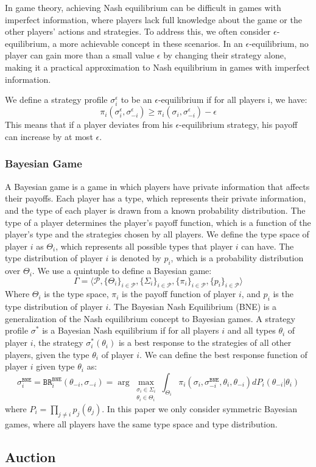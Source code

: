 \documentclass[11pt]{article}
\begin{document}
In game theory, achieving Nash equilibrium can be difficult in games with imperfect information, where players lack full knowledge about the game or the other players' actions and strategies.
To address this, we often consider $\epsilon$-equilibrium, a more achievable concept in these scenarios. In an $\epsilon$-equilibrium, no player can gain more than a small value $\epsilon$ by changing their strategy alone, making it a practical approximation to Nash equilibrium in games with imperfect information.

We define a strategy profile $\sigma^\epsilon_i$ to be an $\epsilon$-equilibrium if for all players i, we have:
$$
\pi_i(\sigma^\epsilon_i,\sigma^\epsilon_{-i}) \geq \pi_i(\sigma_i, \sigma^\epsilon_{-i}) - \epsilon
$$
This means that if a player deviates from his $\epsilon$-equilibrium strategy, his payoff can increase by at most $\epsilon$. 
\subsubsection{Bayesian Game}
A Bayesian game is a game in which players have private information that affects their payoffs. Each player has a type, which represents their private information, and the type of each player is drawn from a known probability distribution. The type of a player determines the player's payoff function, which is a function of the player's type and the strategies chosen by all players.
We define the type space of player $i$ as $\Theta_i$, which represents all possible types that player $i$ can have. The type distribution of player $i$ is denoted by $p_i$, which is a probability distribution over $\Theta_i$.
We use a quintuple to define a Bayesian game:
\begin{equation}
\Gamma = \langle \mathcal{P}, \{\Theta_i\}_{i\in\mathcal{P}}, \{\Sigma_i\}_{i\in\mathcal{P}}, \{\pi_i\}_{i\in\mathcal{P}}, \{p_i\}_{i\in\mathcal{P}} \rangle
\end{equation}
Where $\Theta_i$ is the type space, $\pi_i$ is the payoff function of player $i$, and $p_i$ is the type distribution of player $i$.
The Bayesian Nash Equilibrium (BNE) is a generalization of the Nash equilibrium concept to Bayesian games. A strategy profile $\sigma^*$ is a Bayesian Nash equilibrium if for all players $i$ and all types $\theta_i$ of player $i$, the strategy $\sigma_i^*(\theta_i)$ is a best response to the strategies of all other players, given the type $\theta_i$ of player $i$.
We can define the best response function of player $i$ given type $\theta_i$ as:
\begin{equation}
\sigma^\texttt{BNE}_i=\texttt{BR}^\texttt{BNE}_i(\theta_{-i},\sigma_{-i}) = \arg\max_{\substack{\sigma_i \in \Sigma_i \\ \theta_i\in \Theta_i}} \int_{\Theta_i} \pi_i(\sigma_i,\sigma^\texttt{BNE}_{-i},\theta_i,\theta_{-i})dP_i(\theta_{-i}|\theta_i)
\end{equation}
where $P_i=\prod_{j\neq i}p_j(\theta_j)$. In this paper we only consider symmetric Bayesian games, where all players have the same type space and type distribution.
\subsection{Auction}


\end{document}
